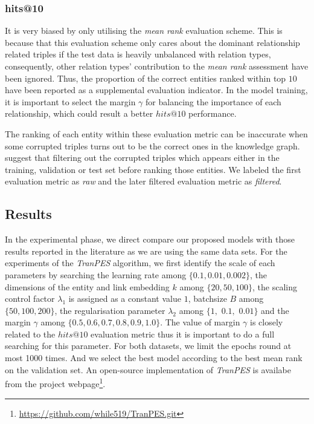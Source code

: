 \documentclass[9pt]{sig-alternate-05-2015}
\begin{document}
\subsubsection{hits@10} 
It is very biased by only utilising the \emph{mean rank} evaluation scheme. This is because that this evaluation scheme only cares about the dominant relationship related triples if the test data is heavily unbalanced with relation types, consequently,  other relation types' contribution to the \emph{mean rank} assessment have been ignored.  Thus, the proportion of the correct entities ranked within top $10$ have been reported as a supplemental evaluation indicator. In the model training, it is important to select the margin $\gamma$ for balancing the importance of each relationship, which could result a better $hits@10$ performance. 

The ranking of each entity within these evaluation metric can be inaccurate when some corrupted triples turns out to be the correct ones in the knowledge graph. \cite{bordes_translating_2013} suggest that filtering out the corrupted triples which appears either in the training, validation or test set before ranking those entities.  We labeled the first evaluation metric as \emph{raw} and the later filtered evaluation metric as \emph{filtered}.


\subsection{Results}
In the experimental phase, we direct compare our proposed models with those results reported in the literature  \cite{lin_learning_2015} as we are using the same data sets. For the experiments of the \emph{TranPES} algorithm, we first identify the scale of each parameters by searching the learning rate among $\{ 0.1, 0.01, 0.002\}$, the dimensions of the entity and link embedding $k$ among $\{ 20, 50, 100 \}$, the scaling control factor $\lambda_1$ is assigned as a constant value $1$, batchsize $B$ among $\{50, 100, 200\}$, the regularisation parameter $\lambda_2$ among $\{ 1,$ $0.1,$ $0.01\}$ and the margin $\gamma$ among $\{0.5, 0.6, 0.7, 0.8, 0.9, 1.0\}$. The value of margin $\gamma$ is closely related to the $hits@10$ evaluation metric thus it is important to do a full searching for this parameter. For both datasets, we limit the epochs round at most 1000 times.  And we select the best model according to the best mean rank on the validation set. An open-source implementation of \emph{TranPES} is availabe from the project webpage\footnote{\url{https://github.com/while519/TranPES.git}}.
\end{document}
